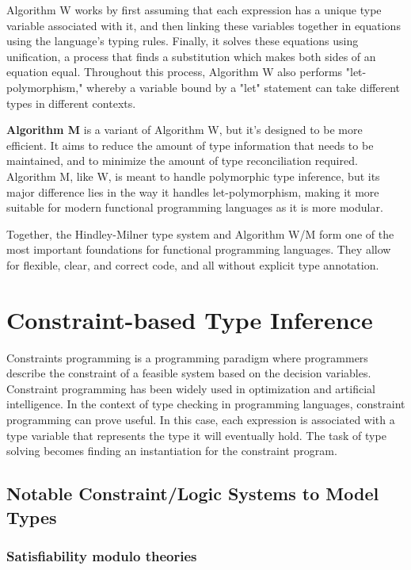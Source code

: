 Algorithm W works by first assuming that each expression has a unique type variable associated with it, and then linking these variables together in equations using the language's typing rules. Finally, it solves these equations using unification, a process that finds a substitution which makes both sides of an equation equal. Throughout this process, Algorithm W also performs "let-polymorphism," whereby a variable bound by a "let" statement can take different types in different contexts.


\textbf{Algorithm M} is a variant of Algorithm W, but it's designed to be more efficient. It aims to reduce the amount of type information that needs to be maintained, and to minimize the amount of type reconciliation required. Algorithm M, like W, is meant to handle polymorphic type inference, but its major difference lies in the way it handles let-polymorphism, making it more suitable for modern functional programming languages as it is more modular.


Together, the Hindley-Milner type system and Algorithm W/M form one of the most important foundations for functional programming languages. They allow for flexible, clear, and correct code, and all without explicit type annotation.

\section{Constraint-based Type Inference}

Constraints programming is a programming paradigm where programmers describe the constraint of a feasible system based on the decision variables. Constraint programming has been widely used in optimization and artificial intelligence. In the context of type checking in programming languages, constraint programming can prove useful. In this case, each expression is associated with a type variable that represents the type it will eventually hold. The task of type solving becomes finding an instantiation for the constraint program.

\subsection{Notable Constraint/Logic Systems to Model Types}

\subsubsection{Satisfiability modulo theories}


